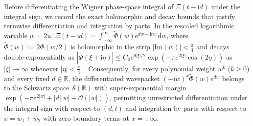 \documentclass[11pt,reqno]{amsart}
\theoremstyle{definition}
\theoremstyle{remark}
\numberwithin{equation}{section}
\newcommand{\R}{\mathbb{R}}
\newcommand{\dd}{\mathrm{d}}
\newcommand{\ee}{\mathrm{e}}
\newcommand{\ii}{\mathrm{i}}
\newcommand{\Ima}{\mathrm{Im}}
\begin{document}
Before differentiating the Wigner phase-space integral of $\Xi(t-\ii d)$ under the integral sign, we record the exact holomorphic and decay bounds that justify termwise differentiation and integration by parts. In the rescaled logarithmic variable $w = 2u$, $\Xi(t-\ii d) = \int_{-\infty}^\infty \widetilde{\Phi}(w)\ee^{dw - \ii tw}\,\dd w$, where $\widetilde{\Phi}(w) := 2\Phi(w/2)$ is holomorphic in the strip $|\Ima(w)| < \frac{\pi}{4}$ and decays double-exponentially as $|\widetilde{\Phi}(\xi + \ii\eta)| \le C_0 \ee^{9|\xi|/2}\exp(-\pi\ee^{2|\xi|}\cos(2\eta))$ as $|\xi| \to \infty$ whenever $|\eta| < \frac{\pi}{4}$~\cite{missiaen2026paper1,missiaen2026paper2}. Consequently, for every polynomial weight $w^k$ ($k \ge 0$) and every fixed $d \in \R$, the differentiated wavepacket $(- \ii w)^k \widetilde{\Phi}(w)\ee^{dw}$ belongs to the Schwartz space $\mathcal{S}(\R)$ with super-exponential margin $\exp(-\pi\ee^{2|w|} + |d||w| + \mathcal{O}(|w|))$, permitting unrestricted differentiation under the integral sign with respect to $(d,t)$ and integration by parts with respect to $x = w_1 + w_2$ with zero boundary terms at $x = \pm\infty$.
\end{document}
